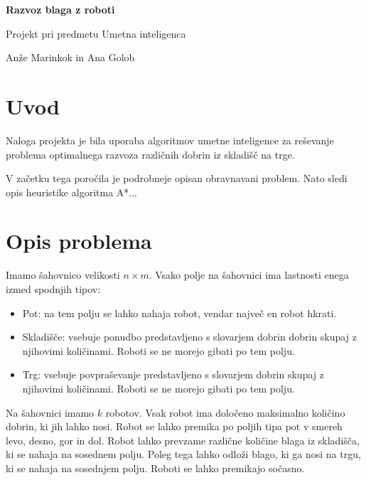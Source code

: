 \documentclass[a4paper,12pt]{article} %
\begin{document}
\begin{center}
\begin{Large}
\textbf{Razvoz blaga z roboti}\\
\end{Large}
\begin{large}
Projekt pri predmetu Umetna inteligenca\\
\vspace{3mm}
\end{large}
Anže Marinkok in  Ana Golob
\end{center}

\section{Uvod}
Naloga projekta je bila uporaba algoritmov umetne inteligence za reševanje problema optimalnega razvoza različnih dobrin iz skladišč na trge. 



V začetku tega poročila je podrobneje opisan obravnavani problem. Nato sledi opis heuristike algoritma A*...



\section{Opis problema}



Imamo šahovnico velikosti $n \times m$. Vsako polje na šahovnici ima lastnosti enega izmed spodnjih tipov:

\begin{itemize}

\item Pot: na tem polju se lahko nahaja robot, vendar največ en robot hkrati.

\item Skladišče: vsebuje ponudbo predstavljeno s slovarjem dobrin dobrin skupaj z njihovimi količinami. Roboti se ne morejo gibati po tem polju.

\item Trg: vsebuje povpraševanje predstavljeno s slovarjem dobrin skupaj z njihovimi količinami. Roboti se ne morejo gibati po tem polju.

\end{itemize}

Na šahovnici imamo $k$ robotov. Vsak robot ima določeno maksimalno količino dobrin, ki jih lahko nosi. Robot se lahko premika po poljih tipa pot v smereh levo, desno, gor in dol. Robot lahko prevzame različne količine blaga iz skladišča, ki se nahaja na sosednem polju. Poleg tega lahko odloži blago, ki ga nosi na trgu, ki se nahaja na sosednjem polju. Roboti se lahko premikajo sočasno.\vspace{3mm}
\end{document}
